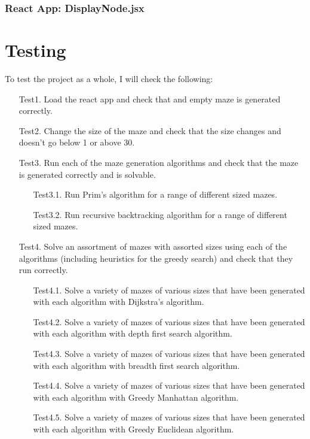 \documentclass[titlepage]{article}
\begin{document}
\subsubsection{React App: DisplayNode.jsx}


\section{Testing}
To test the project as a whole, I will check the following:
\begin{enumerate}
    \item[Test1.] Load the react app and check that and empty maze is generated correctly.
    \item[Test2.] Change the size of the maze and check that the size changes and doesn't go below 1 or above 30.
    \item[Test3.] Run each of the maze generation algorithms and check that the maze is generated correctly and is solvable.
    \begin{enumerate}
        \item[Test3.1.] Run Prim's algorithm for a range of different sized mazes.
        \item[Test3.2.] Run recursive backtracking algorithm for a range of different sized mazes. 
    \end{enumerate} 
    \item[Test4.] Solve an assortment of mazes with assorted sizes using each of the algorithms (including heuristics for the greedy search) and check that they run correctly.
    \begin{enumerate}
        \item[Test4.1.] Solve a variety of mazes of various sizes that have been generated with each algorithm with Dijkstra's algorithm.
        \item[Test4.2.] Solve a variety of mazes of various sizes that have been generated with each algorithm with depth first search algorithm.
        \item[Test4.3.] Solve a variety of mazes of various sizes that have been generated with each algorithm with breadth first search algorithm.
        \item[Test4.4.] Solve a variety of mazes of various sizes that have been generated with each algorithm with Greedy Manhattan algorithm.
        \item[Test4.5.] Solve a variety of mazes of various sizes that have been generated with each algorithm with Greedy Euclidean algorithm.

\end{enumerate}
\end{enumerate}
\end{document}
